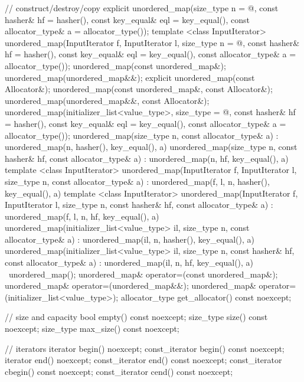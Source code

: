 \begin{codeblock}
{{    // construct/destroy/copy
    explicit unordered_map(size_type n = @\seebelow@,
                           const hasher& hf = hasher(),
                           const key_equal& eql = key_equal(),
                           const allocator_type& a = allocator_type());
    template <class InputIterator>
      unordered_map(InputIterator f, InputIterator l,
                    size_type n = @\seebelow@,
                    const hasher& hf = hasher(),
                    const key_equal& eql = key_equal(),
                    const allocator_type& a = allocator_type());
    unordered_map(const unordered_map&);
    unordered_map(unordered_map&&);
    explicit unordered_map(const Allocator&);
    unordered_map(const unordered_map&, const Allocator&);
    unordered_map(unordered_map&&, const Allocator&);
    unordered_map(initializer_list<value_type>,
      size_type = @\seebelow@,
      const hasher& hf = hasher(),
      const key_equal& eql = key_equal(),
      const allocator_type& a = allocator_type());
    unordered_map(size_type n, const allocator_type& a)
      : unordered_map(n, hasher(), key_equal(), a) { }
    unordered_map(size_type n, const hasher& hf, const allocator_type& a)
      : unordered_map(n, hf, key_equal(), a) { }
    template <class InputIterator>
      unordered_map(InputIterator f, InputIterator l, size_type n, const allocator_type& a)
      : unordered_map(f, l, n, hasher(), key_equal(), a) { }
    template <class InputIterator>
      unordered_map(InputIterator f, InputIterator l, size_type n, const hasher& hf,
      const allocator_type& a)
      : unordered_map(f, l, n, hf, key_equal(), a) { }
    unordered_map(initializer_list<value_type> il, size_type n, const allocator_type& a)
      : unordered_map(il, n, hasher(), key_equal(), a) { }
    unordered_map(initializer_list<value_type> il, size_type n, const hasher& hf,
    const allocator_type& a)
      : unordered_map(il, n, hf, key_equal(), a) { }
    ~unordered_map();
    unordered_map& operator=(const unordered_map&);
    unordered_map& operator=(unordered_map&&);
    unordered_map& operator=(initializer_list<value_type>);
    allocator_type get_allocator() const noexcept;

    // size and capacity
    bool empty() const noexcept;
    size_type size() const noexcept;
    size_type max_size() const noexcept;

    // iterators
    iterator       begin() noexcept;
    const_iterator begin() const noexcept;
    iterator       end() noexcept;
    const_iterator end() const noexcept;
    const_iterator cbegin() const noexcept;
    const_iterator cend() const noexcept;

}}
\end{codeblock}
